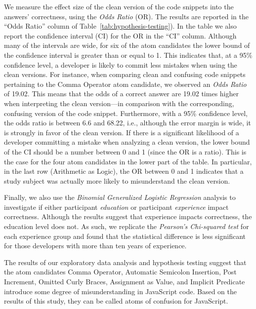 We measure the effect size of the clean version of the code snippets into the answers' correctness, using the \emph{Odds Ratio} (OR). The results are reported in the ``Odds Ratio'' column of Table~\ref{tab:hypothesis-testing}). In the table we also report the confidence interval (CI) for the OR in the ``CI'' column. Although many of the intervals are wide, for six of the atom candidates the lower bound of the confidence interval is greater than or equal to 1. This indicates that, at a 95\% confidence level, a developer is likely to commit less mistakes when using the clean versions.
For instance, when comparing clean and confusing code snippets pertaining to the Comma Operator atom candidate, we observed an \emph{Odds Ratio} of \num{19.02}. This means that the odds of a correct answer are \num{19.02} times higher when interpreting the clean version---in comparison with the corresponding, confusing version of the code snippet. Furthermore, with a 95\% confidence level, the odds  ratio is between 6.6 and 68.22, i.e., although the error margin is wide, it is strongly in favor of the clean version. If there is a significant likelihood of a developer committing a mistake when analyzing a clean version, the lower bound of the CI should be a number between 0 and 1 (since the OR is a ratio). This is the case for the four atom candidates in the lower part of the table. In particular, in the last row (Arithmetic as Logic), the OR between 0 and 1 indicates that a study subject was actually more likely to misunderstand the clean version. 

Finally, we also use the \emph{Binomial Generalized Logistic Regression} analysis to investigate if either participant \emph{education} or participant \emph{experience} impact correctness. Although the results suggest that experience impacts correctness, the education level does not. As such, we replicate the \emph{Pearson's Chi-squared test} for each experience group and found that the statistical difference is less significant for those developers with more than ten years of experience. 

\begin{mh}
  The results of our exploratory data analysis and
  hypothesis testing suggest that the atom
  candidates Comma Operator, Automatic Semicolon Insertion, Post Increment, Omitted Curly Braces, 
  Assignment as Value, and
  Implicit Predicate %
  introduce some degree of misunderstanding
  in JavaScript code. Based on the results of this study, they can be called atoms of confusion for JavaScript.
\end{mh}

